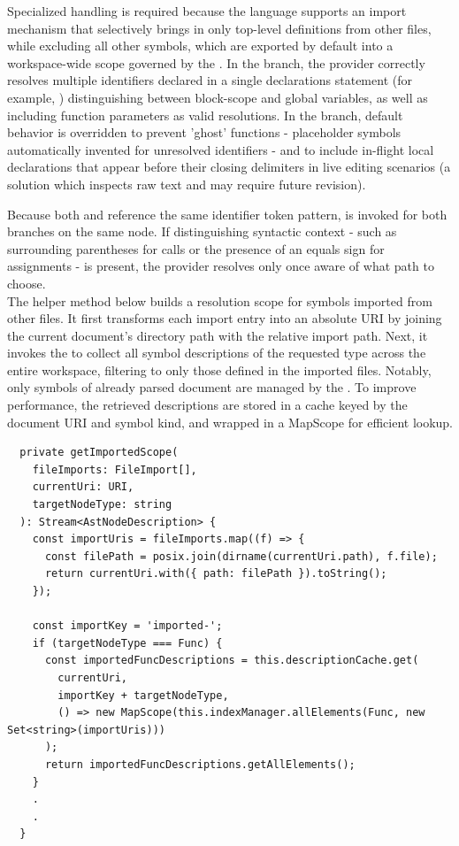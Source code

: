 Specialized handling is required because the language supports an import mechanism that selectively brings in only top-level definitions from other files, while excluding
all other symbols, which are exported by default into a workspace-wide scope governed by the . In the  branch, the provider correctly resolves
multiple identifiers declared in a single declarations statement (for example, ) distinguishing between block-scope and global variables, as well as including function parameters as valid resolutions.
In the  branch, default behavior is overridden to prevent 'ghost' functions - placeholder symbols automatically invented for unresolved identifiers - and to include in-flight local declarations that appear before their closing delimiters in live editing scenarios (a solution which inspects raw  text and may require future revision).

Because both  and  reference the same identifier token pattern,  is invoked for both branches on the same node.
If distinguishing syntactic context - such as surrounding parentheses for calls or the presence of an equals sign for assignments - is present, the provider resolves only once aware of what path to choose.
\\

The helper method below builds a resolution scope for symbols imported from other files. It first transforms each import entry into an absolute URI by joining the current
document's directory path with the relative import path. Next, it invokes the  to collect all symbol descriptions of the requested type across the entire
workspace, filtering to only those defined in the imported files. Notably, only symbols of already parsed document are managed by the .
To improve performance, the retrieved descriptions are stored in a cache keyed by the document URI and symbol kind, and wrapped in a MapScope for efficient lookup. 
\begin{verbatim}
  private getImportedScope(
    fileImports: FileImport[],
    currentUri: URI,
    targetNodeType: string
  ): Stream<AstNodeDescription> {
    const importUris = fileImports.map((f) => {
      const filePath = posix.join(dirname(currentUri.path), f.file);
      return currentUri.with({ path: filePath }).toString();
    });

    const importKey = 'imported-';
    if (targetNodeType === Func) {
      const importedFuncDescriptions = this.descriptionCache.get(
        currentUri,
        importKey + targetNodeType,
        () => new MapScope(this.indexManager.allElements(Func, new Set<string>(importUris)))
      );
      return importedFuncDescriptions.getAllElements();
    } 
    .
    .
  }
\end{verbatim}
\vspace{0.3em}

